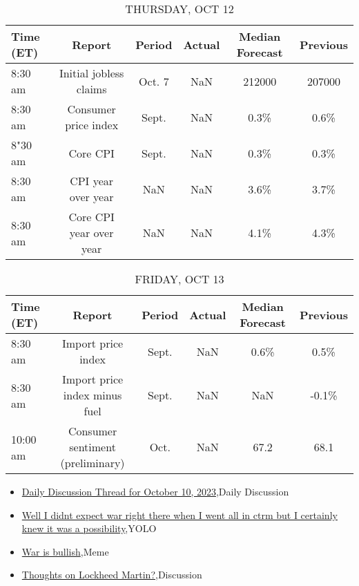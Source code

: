 \documentclass{article}%
\begin{document}
%


\begin{table}[htbp]%
\caption{THURSDAY, OCT 12}%
\centering%
\begin{adjustbox}{width=1\textwidth}%
\begin{tabular}{lccccc}
\toprule
Time (ET) &                  Report & Period & Actual & Median Forecast & Previous \\
\midrule
  8:30 am &  Initial jobless claims & Oct. 7 &    NaN &          212000 &   207000 \\
  8:30 am &    Consumer price index &  Sept. &    NaN &            0.3\% &     0.6\% \\
  8"30 am &                Core CPI &  Sept. &    NaN &            0.3\% &     0.3\% \\
  8:30 am &      CPI year over year &    NaN &    NaN &            3.6\% &     3.7\% \\
  8:30 am & Core CPI year over year &    NaN &    NaN &            4.1\% &     4.3\% \\
\bottomrule
\end{tabular}
%
\end{adjustbox}%
\end{table}

%


\begin{table}[htbp]%
\caption{FRIDAY, OCT 13}%
\centering%
\begin{adjustbox}{width=1\textwidth}%
\begin{tabular}{lccccc}
\toprule
Time (ET) &                           Report & Period & Actual & Median Forecast & Previous \\
\midrule
  8:30 am &               Import price index &  Sept. &    NaN &            0.6\% &     0.5\% \\
  8:30 am &    Import price index minus fuel &  Sept. &    NaN &             NaN &    -0.1\% \\
 10:00 am & Consumer sentiment (preliminary) &   Oct. &    NaN &            67.2 &     68.1 \\
\bottomrule
\end{tabular}
%
\end{adjustbox}%
\end{table}

%
\begin{itemize}%
\item%
\href{https://reddit.com/r/wallstreetbets/comments/174hfe4/daily\_discussion\_thread\_for\_october\_10\_2023/}{Daily Discussion Thread for October 10, 2023},Daily Discussion%
\item%
\href{https://reddit.com/r/wallstreetbets/comments/174gwsn/well\_i\_didnt\_expect\_war\_right\_there\_when\_i\_went/}{Well I didnt expect war right there when I went all in ctrm but I certainly knew it was a possibility},YOLO%
\item%
\href{https://reddit.com/r/wallstreetbets/comments/1749xb5/war\_is\_bullish/}{War is bullish},Meme%
\item%
\href{https://reddit.com/r/StockMarket/comments/174ecin/thoughts\_on\_lockheed\_martin/}{Thoughts on Lockheed Martin?},Discussion%
\end{itemize}%
\end{document}
